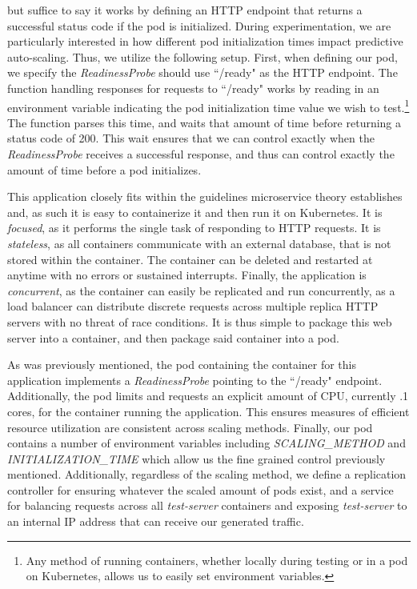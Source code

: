 \begin{itemize}
    but suffice to say it works by defining an HTTP endpoint that returns a
    successful status code if the pod is initialized. During experimentation, we
    are particularly interested in how different pod initialization times impact
    predictive auto-scaling. Thus, we utilize the following setup.
    First, when defining our pod, we specify the \textit{ReadinessProbe} should
    use ``/ready" as the HTTP endpoint. The function handling responses for
    requests to ``/ready" works by reading in an environment variable indicating
    the pod initialization time value we wish to test.\footnote{Any method of
    running containers, whether locally during testing or in a pod on
    Kubernetes, allows us to easily set environment variables.} The function parses this
    time, and waits that amount of time before returning a status code of 200.
    This wait ensures that we can control exactly when the
    \textit{ReadinessProbe} receives a successful response, and thus can
    control exactly the amount of time before a pod initializes.
\end{itemize}

This application closely fits within the guidelines microservice theory
establishes and, as such it is easy to containerize it and then run it on Kubernetes. It
is \textit{focused}, as it performs the single task of responding to HTTP
requests. It is \textit{stateless}, as all containers communicate with an
external database, that is not stored within the container. The container can be
deleted and restarted at anytime with no errors or sustained interrupts.
Finally, the application is \textit{concurrent}, as the container
can easily be replicated and run concurrently, as
a load balancer can distribute discrete requests across multiple replica HTTP
servers with no threat of race conditions. It is thus simple to package this
web server into a container, and then package said container into a pod.

As was previously mentioned, the pod containing the container for this
application implements a \textit{ReadinessProbe} pointing to the ``/ready"
endpoint. Additionally, the pod limits and requests an explicit amount of CPU,
currently .1 cores, for the container running the application. This ensures
measures of efficient resource utilization are consistent across scaling methods.
Finally, our pod contains a number of environment variables including
\textit{SCALING\_METHOD} and \textit{INITIALIZATION\_TIME} which allow us the
fine grained control previously mentioned. Additionally,
regardless of the scaling method, we define a replication controller for
ensuring whatever the scaled amount of pods exist, and a service for balancing
requests across all \textit{test-server} containers and exposing
\textit{test-server} to an internal IP address that can receive our generated
traffic.
